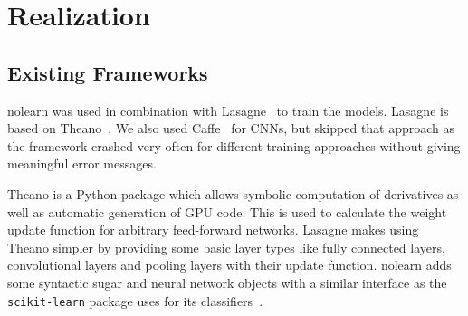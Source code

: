 
\section{Realization}
\subsection{Existing Frameworks}\label{sec:frameworks}
nolearn was used in combination with Lasagne~\cite{sander_dieleman_2015_27878}
to train the models. Lasagne is based on Theano~\cite{Bergstra2010}. We also
used Caffe~\cite{Jia2014} for \glspl{CNN}, but skipped that approach as the
framework crashed very often for different training approaches without giving
meaningful error messages.

Theano is a Python package which allows symbolic computation of derivatives as
well as automatic generation of GPU code. This is used to calculate the weight
update function for arbitrary feed-forward networks. Lasagne makes using Theano
simpler by providing some basic layer types like fully connected layers,
convolutional layers and pooling layers with their update function. nolearn
adds some syntactic sugar and neural network objects with a similar interface
as the \verb+scikit-learn+ package uses for its classifiers~\cite{scikit-learn}.

